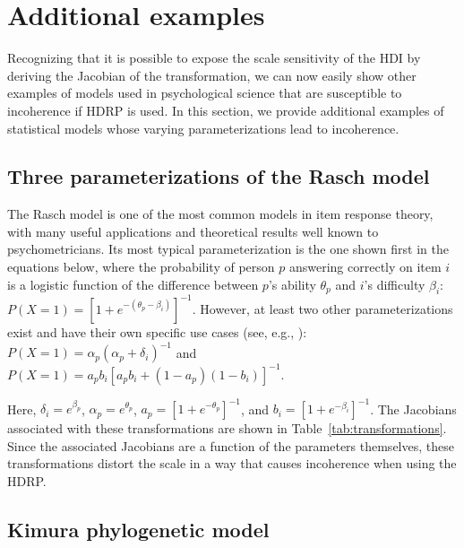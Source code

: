 \documentclass[man]{apa}
\newcommand{\hdr}{HDRP}
\begin{document}
\section*{Additional examples}

Recognizing that it is possible to expose the scale sensitivity of the HDI by deriving the Jacobian of the transformation, we can now easily show other examples of models used in psychological science that are susceptible to incoherence if \hdr{} is used.  In this section, we provide  additional examples of statistical models whose varying parameterizations lead to incoherence.

\subsection*{Three parameterizations of the Rasch model}

The Rasch model \cite{Rasch1960} is one of the most common models in item response theory, with many useful applications and theoretical results well known to psychometricians.  Its most typical parameterization is the one shown first in the equations below, where the probability of person $p$ answering correctly on item $i$ is a logistic function of the difference between $p$'s ability $\theta_p$ and $i$'s difficulty $\beta_i$: $P(X = 1) = \left[1+e^{-(\theta_p-\beta_i)}\right]^{-1}$. However, at least two other parameterizations exist and have their own specific use cases (see, e.g., ): $P(X = 1) = {\alpha_p}\left(\alpha_p + \delta_i\right)^{-1}$ and $P(X = 1) = {a_p b_i}\left[a_pb_i+(1-a_p)(1-b_i)\right]^{-1}$.

Here, $\delta_i = e^{\beta_p}$, $\alpha_p = e^{\theta_p}$, $a_p      = \left[1+e^{-\theta_p}\right]^{-1}$, and $b_i = \left[1+e^{-\beta_i}\right]^{-1}$.
The Jacobians associated with these transformations are shown in Table~\ref{tab:transformations}.  Since the associated Jacobians are a function of the parameters themselves, these transformations distort the scale in a way that causes incoherence when using the \hdr{}.

\subsection*{Kimura phylogenetic model}
\end{document}
